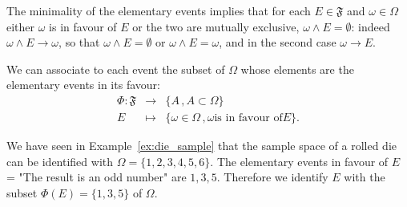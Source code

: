 \begin{remark}
The minimality of the elementary events implies that for each $E \in \mathfrak F$ and $\omega \in \Omega$ either $\omega$ is in favour of $E$ or the two are mutually exclusive, $\omega \wedge E = \emptyset$: indeed $\omega \wedge E \rightarrow \omega$, so that $\omega \wedge E = \emptyset$ or $\omega \wedge E = \omega$, and in the second case $\omega \rightarrow E$.
\end{remark}

We can associate to each event the subset of $\Omega$ whose elements are the elementary events in its favour: 
\begin{equation}
	\label{e:abstract_to_concrete}
	\begin{array}{ccc}
		\Phi: \mathfrak F & \to & \{ A \, , A \subset \Omega\} \\
		E & \mapsto & \{ \omega \in \Omega \, , \omega \textrm{is in favour of} E \}. 
	\end{array}
\end{equation}

\begin{example}[Die]
	\label{ex:die_subset}
	We have seen in Example~\ref{ex:die_sample} that the sample space of a rolled die can be identified with $\Omega = \{1,2,3,4,5,6\}$. The elementary events in favour of $E$ = "The result is an odd number" are $1, 3, 5$. Therefore we identify $E$ with the subset $\Phi(E) = \{1,3,5\}$ of $\Omega$. 
\end{example}

